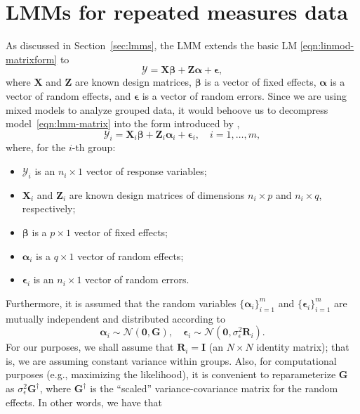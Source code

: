 \documentclass[cmfont,usenames,dvipsnames,leqno]{afit-etd}\usepackage[]{graphicx}\usepackage[]{color}
\newcommand{\bc}[1]{\ensuremath{\bm{\mathcal{#1}}}}
\newcommand{\mc}[1]{\ensuremath{\mathcal{#1}}}
\newcommand{\X}{\ensuremath{\bm{X}}}
\newcommand{\Z}{\ensuremath{\bm{Z}}}
\begin{document}
\section{LMMs for repeated measures data}
\label{sec:calibration-lmm-introduction}
As discussed in Section~\ref{sec:lmms}, the \ac{LMM} extends the basic \ac{LM} \eqref{eqn:linmod-matrixform} to 
\begin{equation}
\label{eqn:lmm-matrix}
  \bc{Y} = \X\bm{\beta} + \Z\bm{\alpha} + \bm{\epsilon},
\end{equation}
where $\X$ and $\Z$ are known design matrices, $\bm{\beta}$ is a vector of fixed effects, $\bm{\alpha}$ is a vector of random effects, and $\bm{\epsilon}$ is a vector of random errors. Since we are using mixed models to analyze grouped data, it would behoove us to decompress model~\eqref{eqn:lmm-matrix} into the form introduced by \citet{laird_random_1982},
\begin{equation}
\label{eqn:lmm-laird-ware}
  \bc{Y}_i = \X_i\bm{\beta} + \Z_i\bm{\alpha}_i + \bm{\epsilon}_i, \quad i = 1, \dotsc, m,
\end{equation}
where, for the $i$-th group:
\begin{itemize}
  \item $\bc{Y}_i$ is an $n_i \times 1$ vector of response variables;
  \item $\X_i$ and $\Z_i$ are known design matrices of dimensions $n_i \times p$ and $n_i \times q$, respectively;
  \item $\bm{\beta}$ is a $p \times 1$ vector of fixed effects;
  \item $\bm{\alpha}_i$ is a $q \times 1$ vector of random effects;
  \item $\bm{\epsilon}_i$ is an $n_i \times 1$ vector of random errors.
\end{itemize}
Furthermore, it is assumed that the random variables $\big\{\bm{\alpha}_i\big\}_{i=1}^m$ and $\big\{\bm{\epsilon}_i\big\}_{i=1}^m$ are mutually independent and distributed according to
\begin{equation*}
  \bm{\alpha}_i \sim \mc{N}\left(\bm{0}, \bm{G}\right), \quad
  \bm{\epsilon}_i \sim \mc{N}\left(\bm{0}, \sigma_\epsilon^2\bm{R}_i\right).
\end{equation*}
For our purposes, we shall assume that $\bm{R}_i = \bm{I}$ (an $N \times N$ identity matrix); that is, we are assuming constant variance within groups. Also, for computational purposes (e.g., maximizing the likelihood), it is convenient to reparameterize $\bm{G}$ as $\sigma_\epsilon^2\bm{G}^\dagger$, where $\bm{G}^\dagger$ is the ``scaled'' variance-covariance matrix for the random effects. In other words, we have that
\end{document}
